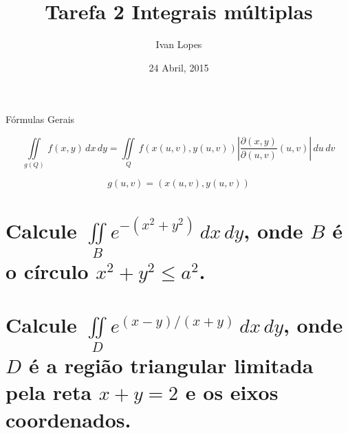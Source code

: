 \documentclass[a4paper]{article}
\title{Tarefa 2 Integrais múltiplas}
\author{Ivan Lopes}
\date{24 Abril, 2015}
\begin{document}
\maketitle

\LARGE Fórmulas Gerais

\newcommand{\IntegralDupla}{\iint\limits}

\begin{equation}
  \IntegralDupla_{g(Q)} \, f(x,y) \, dx\, dy =
  \IntegralDupla_Q \, f(x(u,v), y(u,v)) \left| \frac{\partial (x,y)}{\partial (u,v)}(u,v) \right|\, du\,dv
\end{equation}

\begin{equation}
  g(u,v)=(x(u,v),y(u,v))
\end{equation}

\section{Calcule $\iint\limits_B e^{-(x^2+y^2)}\,dx\,dy$, onde $B$ é o
  círculo $x^2 + y^2 \leq a^2$.}

\section{Calcule $\iint\limits_D e^{(x-y)/(x+y)}\,dx\,dy$, onde $D$ é a
  região triangular limitada pela reta $x+y=2$ e os eixos coordenados.}
\end{document}
